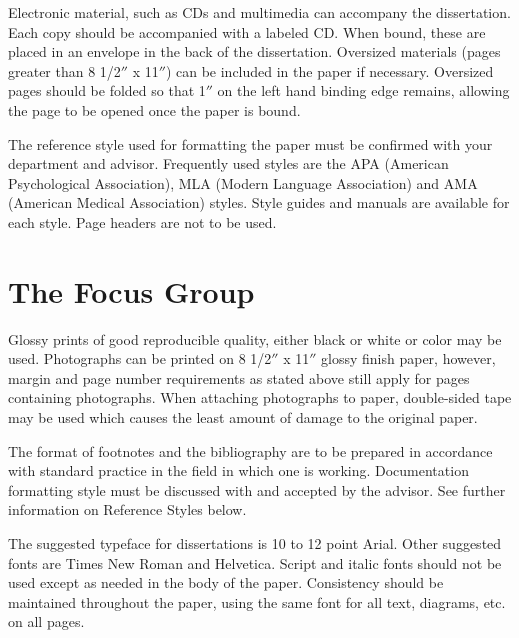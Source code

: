 \documentclass[12pt]{report}
\begin{document}
Electronic material, such as CDs and multimedia can accompany the dissertation. Each copy should be accompanied with a labeled CD. When bound, these are placed in an envelope in the back of the dissertation.  Oversized materials (pages greater than 8 1/2$''$ x 11$''$) can be included in the paper if necessary. Oversized pages should be folded so that 1$''$ on the left hand binding edge remains, allowing the page to be opened once the paper is bound.

The reference style used for formatting the paper must be confirmed with your department and advisor. Frequently used styles are the APA (American Psychological Association), MLA (Modern Language Association) and AMA (American Medical Association) styles. Style guides and manuals are available for each style. Page headers are not to be used.


\section{The Focus Group}    

Glossy prints of good reproducible quality, either black or white or color may be used. Photographs can be printed on 8 1/2$''$ x 11$''$ glossy finish paper, however, margin and page number requirements as stated above still apply for pages containing photographs. When attaching photographs to paper, double-sided tape may be used which causes the least amount of damage to the original paper.

The format of footnotes and the bibliography are to be prepared in accordance with standard practice in the field in which one is working. Documentation formatting style must be discussed with and accepted by the advisor. See further information on Reference Styles below.

The suggested typeface for dissertations is 10 to 12 point Arial. Other suggested fonts are Times New Roman and Helvetica. Script and italic fonts should not be used except as needed in the body of the paper. Consistency should be maintained throughout the paper, using the same font for all text, diagrams, etc. on all pages.
\end{document}
